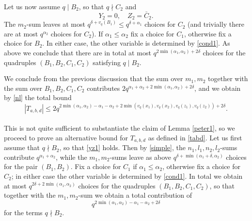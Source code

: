 \documentclass[11pt]{amsart}
\theoremstyle{plain}
\numberwithin{equation}{section}
\theoremstyle{definition}
\renewcommand{\leq}{\leqslant}
\begin{document}
Let us now assume $q \mid B_2$, so that $q \nmid C_2$ and $$Y_2 = 0,  \quad Z_2 = \bar{C}_2.$$ The $m_2$-sum leaves at most $q^{\delta + v_q(B_1)} \leq q^{\delta + \alpha_1}$ choices for $C_2$ (and trivially there are at most $q^{\alpha_2}$ choices for $C_2$). If $\alpha_1 \leq \alpha_2$ fix a choice for $C_1$, otherwise fix a choice for $B_2$. In either case, the other variable is determined by \eqref{cond1}. As above we conclude that there are in total at most $q^{2\min(\alpha_1, \alpha_2) + 2\delta}$ choices for the quadruples $(B_1, B_2, C_1, C_2)$ satisfying $q \mid B_2$.

We conclude from the previous discussion that the sum over $m_1, m_2$ together with the sum over $B_1, B_2, C_1, C_2$ contributes $2q^{\alpha_1 + \alpha_2 + 2\min(\alpha_1, \alpha_2) + 2\delta}$, and we obtain by \eqref{nl} the total bound
\begin{equation}\label{t1}
|T_{a, b, d}| \leq 2q^{2\min(\alpha_1, \alpha_2)- \alpha_1 - \alpha_2 +  2 \min(v_q(x_1), v_q(x_2), v_q(z_1), v_q(z_2))+ 2\delta}.
\end{equation}\\
 
This is not quite sufficient to substantiate the claim of Lemma \ref{peter1}, so we proceed to prove an alternative bound for $T_{a, b, d}$ as defined in \eqref{tabd}. %
Let us first assume that $q \nmid B_2$, so that \eqref{yz1} holds.  Then by \eqref{simple}, the $n_1, l_1, n_2, l_2$-sums contribute $q^{\alpha_1 + \alpha_2}$, while the $m_1, m_2$-sums leave as above $q^{\delta + \min(\alpha_1 +  \delta, \alpha_2)}$ choices for the pair $(B_1, B_2)$. Fix a choice for $C_1$  if $\alpha_1 \leq \alpha_2$, otherwise fix a choice for $C_2$; in either case the other variable is determined by \eqref{cond1}. In total we obtain at most $q^{2\delta + 2\min(\alpha_1, \alpha_2)}$ choices for the quadruples $(B_1, B_2, C_1, C_2)$, so that together with the $m_1, m_2$-sum we obtain a total contribution of 
\begin{equation}\label{easy}
q^{2 \min(\alpha_1, \alpha_2) - \alpha_1- \alpha_2 + 2\delta}
\end{equation}
for the terms $q \nmid B_2$.
\end{document}
